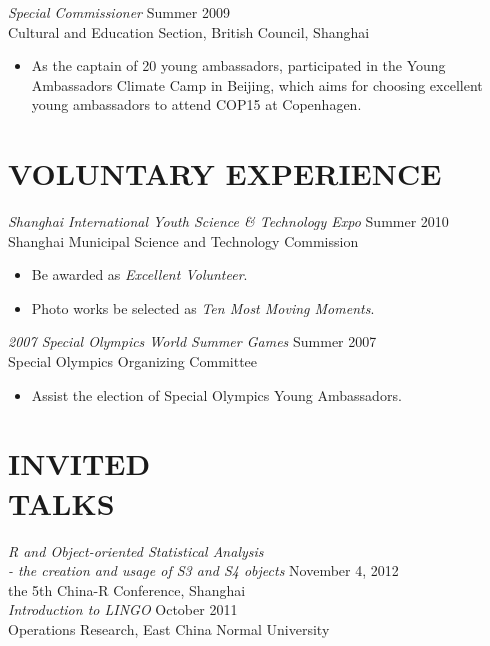 \documentclass[margin]{res}
\begin{document}
\begin{resume}
                {\sl Special Commissioner} \hfill        Summer 2009 \\
                Cultural and Education Section, British Council, Shanghai
                  \begin{itemize}
                   \item As the captain of 20 young ambassadors, participated in the Young Ambassadors Climate Camp in Beijing, which aims for choosing excellent young ambassadors to attend COP15 at Copenhagen. 
                   \end{itemize} 
 
\section{VOLUNTARY EXPERIENCE}{\sl Shanghai International Youth Science \& Technology Expo} \hfill        Summer 2010 \\
Shanghai Municipal Science and Technology Commission
\begin{itemize}  \itemsep -2pt %
                 \item Be awarded as {\it Excellent Volunteer}.
                 \item Photo works be selected as {\it Ten Most Moving Moments}.
                 \end{itemize} 
                 
                 {\sl 2007 Special Olympics World Summer Games} \hfill        Summer 2007 \\
                  Special Olympics Organizing Committee
\begin{itemize}  \itemsep -2pt %
                 \item Assist the election of Special Olympics Young Ambassadors.
                 \end{itemize} 
 

\section{INVITED \\TALKS}{\sl R and Object-oriented Statistical Analysis\\
 - the creation and usage of S3 and S4 objects} \hfill     November 4, 2012\\
 the 5th China-R Conference, Shanghai\\
 {\sl Introduction to LINGO} \hfill     October 2011\\
 Operations Research, East China Normal University


\end{resume}
\end{document}
